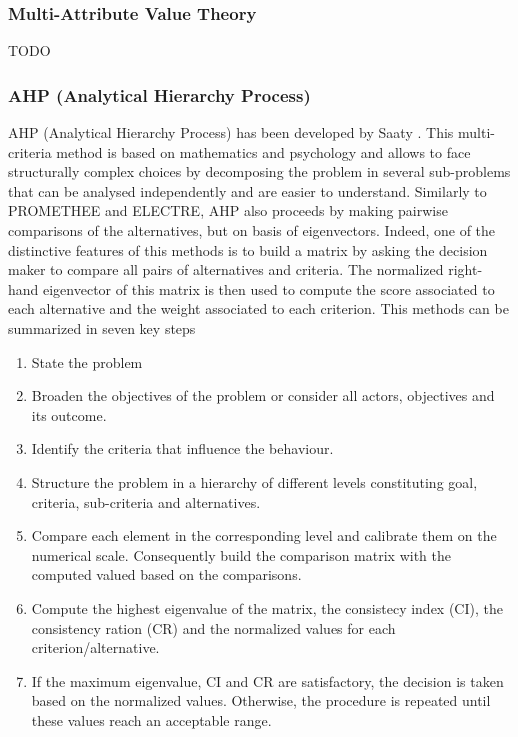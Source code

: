 \subsubsection{Multi-Attribute Value Theory}
TODO

\subsubsection{AHP (Analytical Hierarchy Process)}
AHP (Analytical Hierarchy Process) has been developed by Saaty \cite{MAHP}. This multi-criteria method is based on mathematics and psychology and allows to face structurally complex choices by decomposing the problem in several sub-problems that can be analysed independently and are easier to understand. Similarly to PROMETHEE and ELECTRE, AHP also proceeds by making pairwise comparisons of the alternatives, but on basis of eigenvectors. Indeed, one of the distinctive features of this methods is to build a matrix by asking the decision maker to compare all pairs of alternatives and criteria. The normalized right-hand eigenvector of this matrix is then used to compute the score associated to each alternative and the weight associated to each criterion. This methods can be summarized in seven key steps \cite{Vaidya20061}

\begin{enumerate}
\item State the problem
\item Broaden the objectives of the problem or consider all actors, objectives and its outcome.
\item Identify the criteria that influence the behaviour.
\item Structure the problem in a hierarchy of different levels constituting goal, criteria, sub-criteria and alternatives.
\item Compare each element in the corresponding level and calibrate them on the numerical scale. Consequently build the comparison matrix with the computed valued based on the comparisons.
\item Compute the highest eigenvalue of the matrix, the consistecy index (CI), the consistency ration (CR) and the normalized values for each criterion/alternative.
\item If the maximum eigenvalue, CI and CR are satisfactory, the decision is taken based on the normalized values. Otherwise, the procedure is repeated until these values reach an acceptable range.
\end{enumerate}

